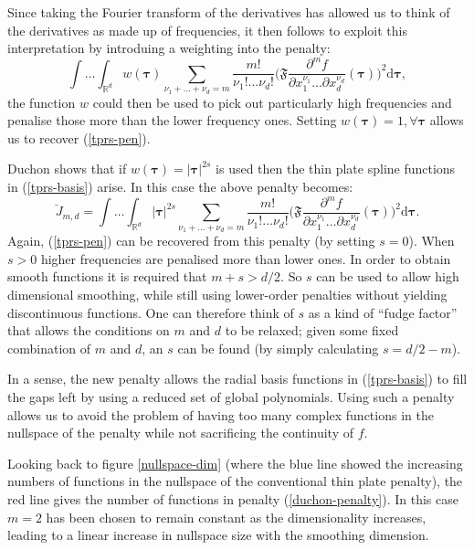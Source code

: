Since taking the Fourier transform of the derivatives has allowed us to think of the derivatives as made up of frequencies, it then follows to exploit this interpretation by introduing a weighting into the penalty: 
\begin{equation}
\int \ldots \int_{\mathbb{R}^d} w(\boldsymbol{\tau}) \sum_{\nu_1 + \dots + \nu_d=m} \frac{m!}{\nu_1! \dots \nu_d!}\Big( \mathfrak{F} \frac{\partial^m f}{\partial x_1^{\nu_1} \ldots  \partial x_d^{\nu_d}}(\boldsymbol{\tau}) \Big)^2 \text{d} \boldsymbol{\tau},
\label{duchon-penalty-general}
\end{equation}
the function $w$ could then be used to pick out particularly high frequencies and penalise those more than the lower frequency ones. Setting $w(\boldsymbol{\tau})=1, \forall \boldsymbol{\tau}$ allows us to recover (\ref{tprs-pen}).

Duchon shows that if $w(\boldsymbol{\tau})= \lvert \boldsymbol{\tau} \rvert^{2s}$ is used then the thin plate spline functions in (\ref{tprs-basis}) arise. In this case the above penalty becomes:
\begin{equation}
\breve{J}_{m,d} = \int \ldots \int_{\mathbb{R}^d} \lvert \boldsymbol{\tau} \rvert^{2s} \sum_{\nu_1 + \dots + \nu_d=m} \frac{m!}{\nu_1! \dots \nu_d!}\Big( \mathfrak{F} \frac{\partial^m f}{\partial x_1^{\nu_1} \ldots  \partial x_d^{\nu_d}}(\boldsymbol{\tau}) \Big)^2 \text{d} \boldsymbol{\tau}.
\label{duchon-penalty}
\end{equation}
Again, (\ref{tprs-pen}) can be recovered from this penalty (by setting $s=0$). When $s>0$ higher frequencies are penalised more than lower ones. In order to obtain smooth functions it is required that $m+s>d/2$. So $s$ can be used to allow high dimensional smoothing, while still using lower-order penalties without yielding discontinuous functions. One can therefore think of $s$ as a kind of ``fudge factor'' that allows the conditions on $m$ and $d$ to be relaxed; given some fixed combination of $m$ and $d$, an $s$ can be found (by simply calculating $s=d/2-m$).

In a sense, the new penalty allows the radial basis functions in (\ref{tprs-basis}) to fill the gaps left by using a reduced set of global polynomials. Using such a penalty allows us to avoid the problem of having too many complex functions in the nullspace of the penalty while not sacrificing the continuity of $f$. 

Looking back to figure \ref{nullspace-dim} (where the blue line showed the increasing numbers of functions in the nullspace of the conventional thin plate penalty), the red line gives the number of functions in penalty (\ref{duchon-penalty}). In this case $m=2$ has been chosen to remain constant as the dimensionality increases, leading to a linear increase in nullspace size with the smoothing dimension.


